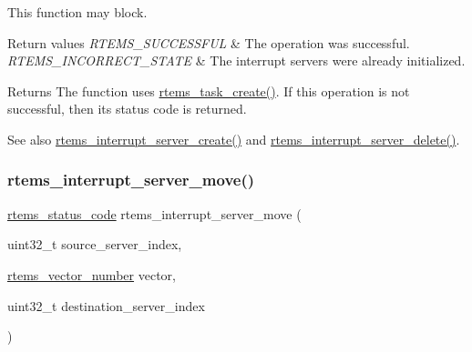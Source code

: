 This function may block.


\begin{DoxyRetVals}{Return values}
{\em R\+T\+E\+M\+S\+\_\+\+S\+U\+C\+C\+E\+S\+S\+F\+UL} & The operation was successful.\\
\hline
{\em R\+T\+E\+M\+S\+\_\+\+I\+N\+C\+O\+R\+R\+E\+C\+T\+\_\+\+S\+T\+A\+TE} & The interrupt servers were already initialized.\\
\hline
\end{DoxyRetVals}
\begin{DoxyReturn}{Returns}
The function uses \mbox{\hyperlink{group__ClassicTasks_gabffda1c2301962f0ae5af042ac0bba62}{rtems\+\_\+task\+\_\+create()}}. If this operation is not successful, then its status code is returned.
\end{DoxyReturn}
\begin{DoxySeeAlso}{See also}
\mbox{\hyperlink{group__rtems__interrupt__extension_gad7725dd729bfd34f36c0de4d9c326abc}{rtems\+\_\+interrupt\+\_\+server\+\_\+create()}} and \mbox{\hyperlink{group__rtems__interrupt__extension_gaa1093bab07e2fe4be3ea1025ea5d15a7}{rtems\+\_\+interrupt\+\_\+server\+\_\+delete()}}. 
\end{DoxySeeAlso}
\mbox{\label{group__rtems__interrupt__extension_gaea09674f8f28aacbaad076e1e31dcdad}} 
\subsubsection{\texorpdfstring{rtems\_interrupt\_server\_move()}{rtems\_interrupt\_server\_move()}}
{\footnotesize\ttfamily \mbox{\hyperlink{group__ClassicStatus_ga545d41846817eaba6143d52ee4d9e9fe}{rtems\+\_\+status\+\_\+code}} rtems\+\_\+interrupt\+\_\+server\+\_\+move (\begin{DoxyParamCaption}\item[{uint32\+\_\+t}]{source\+\_\+server\+\_\+index,  }\item[{\mbox{\hyperlink{group__ClassicINTR_ga3e434c197d99f128e78cae4d9358bd8b}{rtems\+\_\+vector\+\_\+number}}}]{vector,  }\item[{uint32\+\_\+t}]{destination\+\_\+server\+\_\+index }\end{DoxyParamCaption})}



